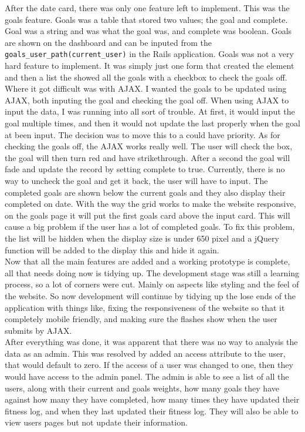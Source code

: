 After the date card, there was only one feature left to implement. This was the goals feature. Goals was a table that stored two values; the goal and complete. Goal was a string and was what the goal was, and complete was boolean. Goals are shown on the dashboard and can be inputed from the \lstinline{goals_user_path(current_user)} in the Rails application. Goals was not a very hard feature to implement. It was simply just one form that created the element and then a list the showed all the goals with a checkbox to check the goals off. Where it got difficult was with AJAX. I wanted the goals to be updated using AJAX, both inputing the goal and checking the goal off. When using AJAX to input the data, I was running into all sort of trouble. At first, it would input the goal multiple times, and then it would not update the last properly when the goal at been input. The decision was to move this to a could have priority. As for checking the goals off, the AJAX works really well. The user will check the box, the goal will then turn red and have strikethrough. After a second the goal will fade and update the record by setting complete to true. Currently, there is no way to uncheck the goal and get it back, the user will have to input. The completed goals are shown below the current goals and they also display their completed on date. With the way the grid works to make the website responsive, on the goals page it will put the first goals card above the input card. This will cause a big problem if the user has a lot of completed goals. To fix this problem, the list will be hidden when the display size is under 650 pixel and a jQuery function will be added to the display this and hide it again.\\

Now that all the main features are added and a working prototype is complete, all that needs doing now is tidying up. The development stage was still a learning process, so a lot of corners were cut. Mainly on aspects like styling and the feel of the website. So now development will continue by tidying up the lose ends of the application with things like, fixing the responsiveness of the website so that it completely mobile friendly, and making sure the flashes show when the user submits by AJAX.\\

After everything was done, it was apparent that there was no way to analysis the data as an admin. This was resolved by added an access attribute to the user, that would default to zero. If the access of a user was changed to one, then they would have access to the admin panel. The admin is able to see a list of all the users, along with their current and goals weights, how many goals they have against how many they have completed, how many times they have updated their fitness log, and when they last updated their fitness log. They will also be able to view users pages but not update their information. \\

